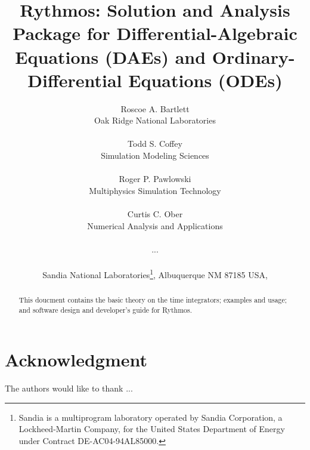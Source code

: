 \documentclass[pdf,ps2pdf,11pt]{SANDreport}
\title{ Rythmos: Solution and Analysis Package for Differential-Algebraic Equations (DAEs) and Ordinary-Differential Equations (ODEs) }
\author{
Roscoe A. Bartlett \\ Oak Ridge National Laboratories \\ \\
Todd S. Coffey \\ Simulation Modeling Sciences \\ \\
Roger P. Pawlowski \\ Multiphysics Simulation Technology \\ \\
Curtis C. Ober \\ Numerical Analysis and Applications \\ \\
... \\ \\
Sandia National Laboratories\footnote{
Sandia is a multiprogram laboratory operated by Sandia Corporation, a
Lockheed-Martin Company, for the United States Department of Energy
under Contract DE-AC04-94AL85000.}, Albuquerque NM 87185 USA, \\
}
\date{}
\begin{document}
\raggedright

\maketitle

%

%
\begin{abstract}
%
This doucment contains the basic theory on the time integrators;
examples and usage; and software design and developer's guide for Rythmos.
%
\end{abstract}
%

%
\clearpage
\section*{Acknowledgment}
The authors would like to thank ...


%
\clearpage
\tableofcontents
\listoffigures


\end{document}
